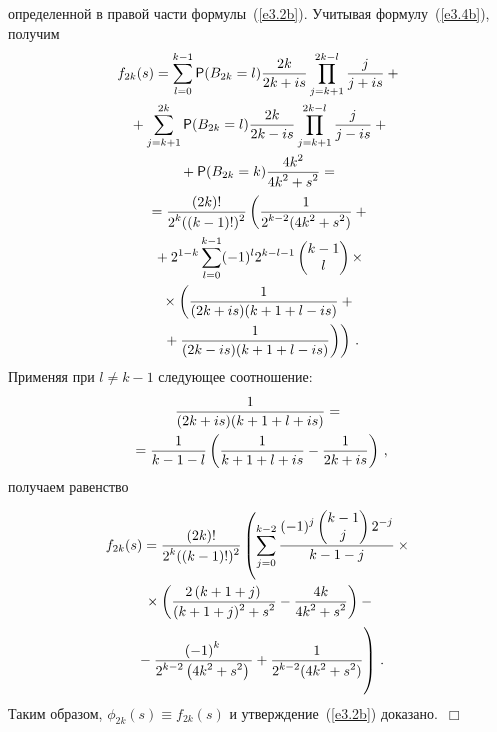 \begin{multicols}{2}
определенной
 в правой части формулы~(\ref{e3.2b}). Учитывая формулу~(\ref{e3.4b}), получим
\begin{multline*}
f_{2k}(s)=\sum\limits_{l=0}^{k-1}{\p(B_{2k}=l)
\fr{2k}{2k+is}\prod\limits_{j=k+1}^{2k-l}{\fr{j}{j+is}}}+{}\\
{}+
\sum\limits_{j=k+1}^{2k}{\p(B_{2k}=l)\fr{2k}{2k-is}\prod\limits_{j=k+1}^{2k-l}\fr{j}{j-is}}+{}\\
{}+
\p(B_{2k}=k)\fr{4k^2}{4k^2+s^2}={}\\
{}=
\fr{(2k)!}{2^k ((k-1)!)^2} \left( \fr{1}{2^{k-2}(4k^2+s^2)}
+{}\right.\\
\left.{}+2^{1-k}\sum\limits_{l=0}^{k-1}(-1)^l 2^{k-l-1}
\begin{pmatrix}
k-1\\ l\end{pmatrix}\times\right.{}\\
{}\times
\left( \fr{1}{(2k+is)(k+1+l-is)}+{}\right.\\
\left.\left.{}+ 
\fr{1}{(2k-is)(k+1+l-is)}\right) \right)\,.
\end{multline*}
Применяя при $l \ne k-1$ следующее соотношение:
\begin{multline*}
\fr{1}{(2k+is)(k+1+l+is)}={}\\
{}=
\fr{1}{k-1-l}\left( \fr{1}{k+1+l+is} - \fr{1}{2k+is}\right)\,,
\end{multline*}
получаем равенство

\noindent
\begin{multline*}
f_{2k}(s)=
\fr{(2k)!}{2^k ((k-1)!)^2}
\left( \sum\limits_{j=0}^{k-2}
\fr{(-1)^j 
\begin{pmatrix}
k-1\\ j
\end{pmatrix}
2^{-j}}{k-1-j}\times{}\right.\\
\left.{}\times
\left(
\fr{2\left(k+1+j\right)}{(k+1+j)^2+s^2} 
-  \fr{4k}{4k^2+s^2} \right)
-{}\right. \\
\left.{}- \fr{\left(-1\right)^k}{2^{k-2}\left(4k^2+s^2\right)} + \fr{1}{2^{k-2}(4k^2+s^2)}
\vphantom{\sum_{j=0}^{k-2}
\fr{(-1)^j 
\begin{pmatrix}
k-1\\ j
\end{pmatrix}
2^{-j}}{k-1-j}}
\right)\,.
\end{multline*}
Таким образом,  $\phi_{2k}(s)\equiv f_{2k}(s)$ и утверждение~(\ref{e3.2b})
доказано.~$\Box$

{\small\frenchspacing
{%
\begin{thebibliography}{9}


\end{thebibliography}}}
\end{multicols}
